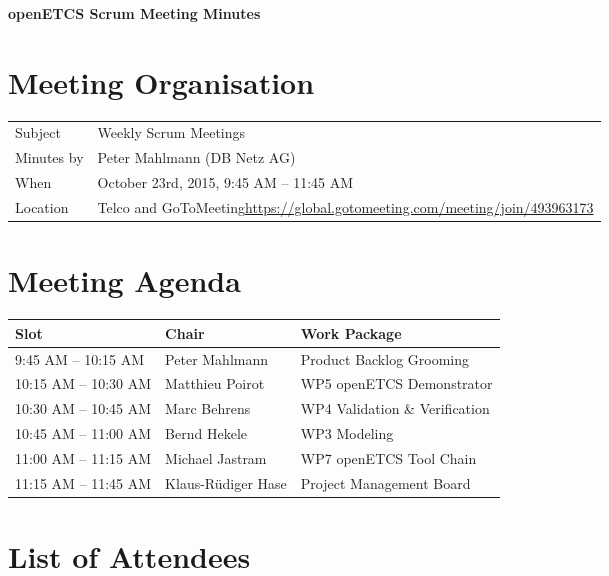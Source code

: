 \documentclass[a4paper, 11pt]{article}
\begin{document}
{\begin{center}\huge\bf openETCS Scrum Meeting Minutes\end{center}}

\section{Meeting Organisation}

\renewcommand{\arraystretch}{1.5}
\begin{supertabular}{m{.2\textwidth}m{.8\textwidth}}
Subject & Weekly Scrum Meetings\\
Minutes by & Peter Mahlmann (DB Netz AG)\\
When & October 23rd, 2015, 9:45 AM -- 11:45 AM\\
Location & Telco and GoToMeeting\newline \url{https://global.gotomeeting.com/meeting/join/493963173}\\
\end{supertabular}

\renewcommand{\arraystretch}{1.0}
\section{Meeting Agenda}

\begin{tabular}{lll}
\toprule
\textbf{Slot} &  \textbf{Chair} & \textbf{Work Package} \\
\midrule 
9:45 AM -- 10:15 AM & Peter Mahlmann & Product Backlog Grooming  \\
10:15 AM -- 10:30 AM & Matthieu Poirot & WP5 openETCS Demonstrator \\  
10:30 AM -- 10:45 AM & Marc Behrens & WP4 Validation \& Verification \\
10:45 AM -- 11:00 AM & Bernd Hekele & WP3 Modeling \\
11:00 AM -- 11:15 AM & Michael Jastram & WP7 openETCS Tool Chain \\
11:15 AM -- 11:45 AM & Klaus-R\"udiger Hase & Project Management Board \\
\bottomrule
\end{tabular}

\section{List of Attendees}
\end{document}
